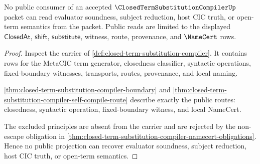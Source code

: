 \begin{theorem}
\label{thm:closed-term-substitution-compiler-public-nonescape}
No public consumer of an accepted $\ClosedTermSubstitutionCompilerUp$ packet can read evaluator soundness, subject reduction, host CIC truth, or open-term semantics from the packet. Public reads are limited to the displayed $\mathsf{ClosedAt}$, $\mathsf{shift}$, $\mathsf{substitute}$, witness, route, provenance, and $\NameCert$ rows.
\end{theorem}
\begin{proof}
Inspect the carrier of \autoref{def:closed-term-substitution-compiler}. It contains rows for the MetaCIC term generator, closedness classifier, syntactic operations, fixed-boundary witnesses, transports, routes, provenance, and local naming.

\autoref{thm:closed-term-substitution-compiler-boundary} and \autoref{thm:closed-term-substitution-compiler-self-compile-route} describe exactly the public routes: closedness, syntactic operation, fixed-boundary witness, and local NameCert.

The excluded principles are absent from the carrier and are rejected by the non-escape obligation in \autoref{thm:closed-term-substitution-compiler-namecert-obligations}. Hence no public projection can recover evaluator soundness, subject reduction, host CIC truth, or open-term semantics.
\end{proof}


